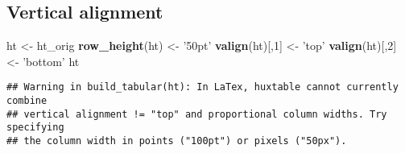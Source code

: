 \documentclass[]{article}
\newenvironment{Shaded}{\begin{snugshade}}{\end{snugshade}}
\newcommand{\KeywordTok}[1]{\textcolor[rgb]{0.13,0.29,0.53}{\textbf{{#1}}}}
\newcommand{\DecValTok}[1]{\textcolor[rgb]{0.00,0.00,0.81}{{#1}}}
\newcommand{\StringTok}[1]{\textcolor[rgb]{0.31,0.60,0.02}{{#1}}}
\newcommand{\NormalTok}[1]{{#1}}
\begin{document}
\FloatBarrier

\subsection{Vertical alignment}\label{vertical-alignment}

\begin{Shaded}
\begin{Highlighting}[]
\NormalTok{ht <-}\StringTok{ }\NormalTok{ht_orig}
\KeywordTok{row_height}\NormalTok{(ht) <-}\StringTok{ '50pt'}
\KeywordTok{valign}\NormalTok{(ht)[,}\DecValTok{1}\NormalTok{] <-}\StringTok{ 'top'}
\KeywordTok{valign}\NormalTok{(ht)[,}\DecValTok{2}\NormalTok{] <-}\StringTok{ 'bottom'}
\NormalTok{ht}
\end{Highlighting}
\end{Shaded}

\begin{verbatim}
## Warning in build_tabular(ht): In LaTex, huxtable cannot currently combine
## vertical alignment != "top" and proportional column widths. Try specifying
## the column width in points ("100pt") or pixels ("50px").
\end{verbatim}
\end{document}
